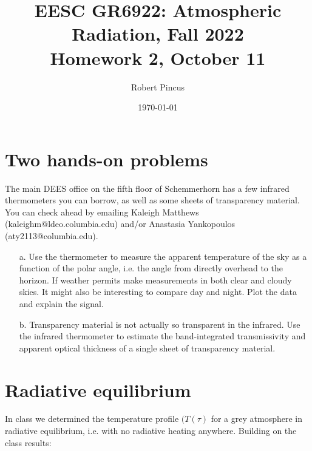\documentclass{article}
\title{EESC GR6922: Atmospheric Radiation, Fall 2022 \\ Homework 2, October 11}
\author{Robert Pincus}
\date{\today}
\begin{document}
\maketitle
\section{Two hands-on problems}

The main DEES office on the fifth floor of Schemmerhorn has a few infrared thermometers you can borrow, as well as some sheets of transparency material. You can check ahead by emailing Kaleigh Matthews (kaleighm@ldeo.columbia.edu) and/or Anastasia  Yankopoulos (aty2113@columbia.edu).

\begin{enumerate}

\item[a.] Use the thermometer to measure the apparent temperature of the sky as a function of the polar angle, i.e. the angle from directly overhead to the horizon. If weather permits make measurements in both clear and cloudy skies. It might also be interesting to compare day and night. Plot the data and explain the signal. 

\item[b.] Transparency material is not actually so transparent in the infrared. Use the infrared thermometer to estimate the band-integrated transmissivity and apparent optical thickness of a single sheet of transparency material.  

\end{enumerate}
\section{Radiative equilibrium}

In class we determined the temperature profile $(T(\tau)$ for a grey atmosphere in radiative equilibrium, i.e. with no radiative heating anywhere. Building on the class results:
\end{document}
